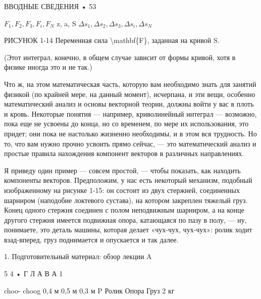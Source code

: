 \documentclass[10pt,oneside]{article}
\newcommand{\TipsRunning}[1]{\par\vspace{2bp}{\centering\footnotesize #1\par}\vspace{2bp}}
\newcommand{\TipsSubsection}[1]{\par\vspace{6bp}{\normalsize\bfseries #1\par}\vspace{2bp}}
\begin{document}
ВВОДНЫЕ СВЕДЕНИЯ • 53\par

\(F_1, F_2, F_3, F_i, F_N\) z, a, S \(\Delta s_1, \Delta s_2, \Delta s_3, \Delta s_i, \Delta s_N\)\par

РИСУНОК 1-14 Переменная сила \textbackslash{}mathbf\{F\}, заданная на кривой S.\par

(Этот интеграл, конечно, в общем случае зависит от формы кривой, хотя в физике иногда это и не так.)\par

Что ж, на этом математическая часть, которую вам необходимо знать для занятий физикой (по крайней мере, на данный момент), исчерпана, и эти вещи, особенно математический анализ и основы векторной теории, должны войти у вас в плоть и кровь. Некоторые понятия --- например, криволинейный интеграл --- возможно, пока еще не усвоены до конца, но со временем, по мере их использования, это придет; они пока не настолько жизненно необходимы, и в этом вся трудность. Но то, что вам нужно прочно усвоить прямо сейчас, --- это математический анализ и простые правила нахождения компонент векторов в различных направлениях.\par

\TipsSubsection{1-9 Простой пример}

Я приведу один пример --- совсем простой, --- чтобы показать, как находить компоненты векторов. Предположим, у нас есть некоторый механизм, подобный изображенному на рисунке 1-15: он состоит из двух стержней, соединенных шарниром (наподобие локтевого сустава), на котором закреплен тяжелый груз. Конец одного стержня соединен с полом неподвижным шарниром, а на конце другого стержня имеется подвижная опора, катающаяся по пазу в полу, --- ну, понимаете, это деталь машины, которая делает «чух-чух, чух-чух»: ролик ходит взад-вперед, груз поднимается и опускается и так далее.\par

1. Подготовительный материал: обзор лекции A\par

5 4 • Г Л А В А  1\par

choo- choog 0,4 м 0,5 м 0,3 м P Ролик Опора Груз 2 кг\par

\TipsRunning{Р И С У Н О К  1 - 1 6 Какая сила P требуется, чтобы удержать груз?}

\TipsRunning{Р И С У Н О К  1 - 1 5 Простой механизм.}
\end{document}
